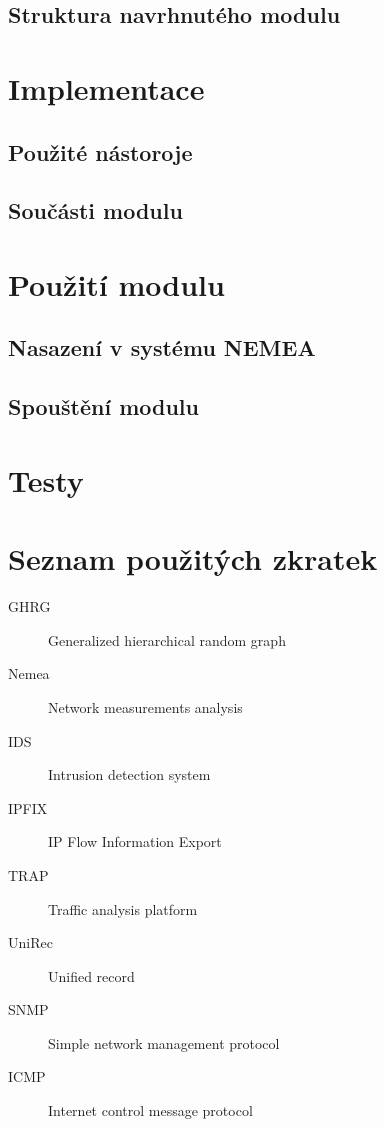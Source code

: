 \documentclass[thesis=M,czech]{FITthesis}[2012/06/26]
\begin{document}
\section{Struktura navrhnutého modulu}

\chapter{Implementace}
\section{Použité nástoroje}
\section{Součásti modulu}

\chapter{Použití modulu}
\section{Nasazení v systému NEMEA}
\section{Spouštění modulu}

\chapter{Testy}

\begin{conclusion}
\end{conclusion}




\appendix

\chapter{Seznam použitých zkratek}
\begin{description}
	\item[GHRG] Generalized hierarchical random graph
	\item[Nemea] Network measurements analysis
	\item[IDS] Intrusion detection system
	\item[IPFIX] IP Flow Information Export
	\item[TRAP] Traffic analysis platform
	\item[UniRec] Unified record
	\item[SNMP] Simple network management protocol
	\item[ICMP] Internet control message protocol
\end{description}
\end{document}
